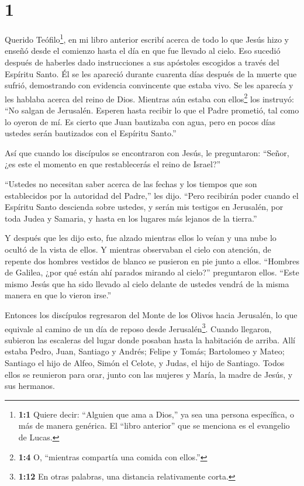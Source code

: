 \hypertarget{section}{%
\section{1}\label{section}}

 Querido Teófilo\footnote{\textbf{1:1} Quiere decir:
  ``Alguien que ama a Dios,'' ya sea una persona específica, o más de
  manera genérica. El ``libro anterior'' que se menciona es el evangelio
  de Lucas.}, en mi libro anterior escribí acerca de todo lo que Jesús
hizo y enseñó desde el comienzo  hasta el día en que fue
llevado al cielo. Eso sucedió después de haberles dado instrucciones a
sus apóstoles escogidos a través del Espíritu Santo.  Él se
les apareció durante cuarenta días después de la muerte que sufrió,
demostrando con evidencia convincente que estaba vivo. Se les aparecía y
les hablaba acerca del reino de Dios.  Mientras aún estaba
con ellos\footnote{\textbf{1:4} O, ``mientras compartía una comida con
  ellos.''} los instruyó: ``No salgan de Jerusalén. Esperen hasta
recibir lo que el Padre prometió, tal como lo oyeron de mí. 
Es cierto que Juan bautizaba con agua, pero en pocos días ustedes serán
bautizados con el Espíritu Santo.''

 Así que cuando los discípulos se encontraron con Jesús, le
preguntaron: ``Señor, ¿es este el momento en que restablecerás el reino
de Israel?''

 ``Ustedes no necesitan saber acerca de las fechas y los
tiempos que son establecidos por la autoridad del Padre,'' les dijo.
 ``Pero recibirán poder cuando el Espíritu Santo descienda
sobre ustedes, y serán mis testigos en Jerusalén, por toda Judea y
Samaria, y hasta en los lugares más lejanos de la tierra.''

 Y después que les dijo esto, fue alzado mientras ellos lo
veían y una nube lo ocultó de la vista de ellos.  Y
mientras observaban el cielo con atención, de repente dos hombres
vestidos de blanco se pusieron en pie junto a ellos. 
``Hombres de Galilea, ¿por qué están ahí parados mirando al cielo?''
preguntaron ellos. ``Este mismo Jesús que ha sido llevado al cielo
delante de ustedes vendrá de la misma manera en que lo vieron irse.''

 Entonces los discípulos regresaron del Monte de los Olivos
hacia Jerusalén, lo que equivale al camino de un día de reposo desde
Jerusalén\footnote{\textbf{1:12} En otras palabras, una distancia
  relativamente corta.}.  Cuando llegaron, subieron las
escaleras del lugar donde posaban hasta la habitación de arriba. Allí
estaba Pedro, Juan, Santiago y Andrés; Felipe y Tomás; Bartolomeo y
Mateo; Santiago el hijo de Alfeo, Simón el Celote, y Judas, el hijo de
Santiago.  Todos ellos se reunieron para orar, junto con
las mujeres y María, la madre de Jesús, y sus hermanos.

